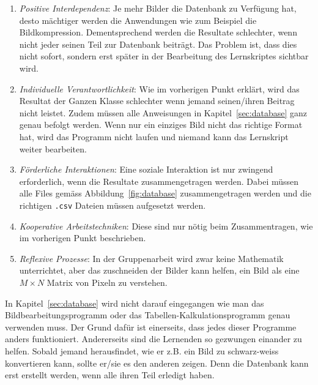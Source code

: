 \begin{enumerate}[label=\arabic*.]
	\item \textit{Positive Interdependenz}: Je mehr Bilder die Datenbank zu Verfügung hat, desto mächtiger werden die Anwendungen wie zum Beispiel die Bildkompression.
	Dementsprechend werden die Resultate schlechter, wenn nicht jeder seinen Teil zur Datenbank beiträgt. 
	Das Problem ist, dass dies nicht sofort, sondern erst später in der Bearbeitung des Lernskriptes sichtbar wird.
	\item \textit{Individuelle Verantwortlichkeit}: Wie im vorherigen Punkt erklärt, wird das Resultat der Ganzen Klasse schlechter wenn jemand seinen/ihren Beitrag nicht leistet.
	Zudem müssen alle Anweisungen in Kapitel~\ref{sec:database} ganz genau befolgt werden.
	Wenn nur ein einziges Bild nicht das richtige Format hat, wird das Programm nicht laufen und niemand kann das Lernskript weiter bearbeiten.
	\item \textit{Förderliche Interaktionen}: Eine soziale Interaktion ist nur zwingend erforderlich, wenn die Resultate zusammengetragen werden.
	Dabei müssen alle Files gemäss Abbildung~\ref{fig:database} zusammengetragen werden und die richtigen \texttt{.csv} Dateien müssen aufgesetzt werden.
	\item \textit{Kooperative Arbeitstechniken}: Diese sind nur nötig beim Zusammentragen, wie im vorherigen Punkt beschrieben.
	\item \textit{Reflexive Prozesse}: In der Gruppenarbeit wird zwar keine Mathematik unterrichtet, aber das zuschneiden der Bilder kann helfen, ein Bild als eine $M\times N$ \glqq{}Matrix\grqq{} von Pixeln zu verstehen.
\end{enumerate}
In Kapitel~\ref{sec:database} wird nicht darauf eingegangen wie man das Bildbearbeitungsprogramm oder das Tabellen-Kalkulationsprogramm genau verwenden muss.
Der Grund dafür ist einerseits, dass jedes dieser Programme anders funktioniert.
Andererseits sind die Lernenden so gezwungen einander zu helfen.
Sobald jemand herausfindet, wie er z.B. ein Bild zu schwarz-weiss konvertieren kann, sollte er/sie es den anderen zeigen.
Denn die Datenbank kann erst erstellt werden, wenn alle ihren Teil erledigt haben.